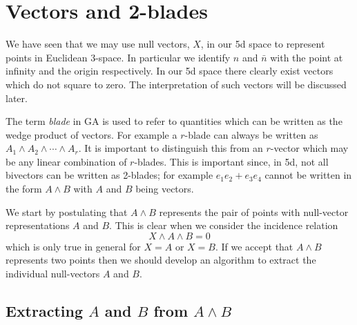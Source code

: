 \section{Vectors and 2-blades}

We have seen that we may use null vectors, $X$, in our 5d space to represent 
points in Euclidean 3-space. In particular we identify $n$ and $\bar{n}$ with 
the point at infinity and the origin respectively. In our 5d space there
clearly exist vectors which do not square to zero. The interpretation of such 
vectors will be discussed later.

The term \emph{blade} in GA is used to refer to quantities which can be written as the wedge
product of vectors. For example a $r$-blade can always be written as
$A_1\wedge A_2 \wedge \cdots \wedge A_r$. It is important to distinguish this
from an $r$-vector which may be any linear combination of $r$-blades. 
This is important since, in 5d, not all bivectors can be written as 2-blades;
for example $e_1e_2 + e_3e_4$ cannot be written in the form $A\wedge B$
with $A$ and $B$ being vectors. 

We start by
postulating that $A \wedge B$ represents the pair of points 
with null-vector representations $A$ and $B$. This is clear when 
we consider the incidence 
relation
\[
X \wedge A \wedge B = 0
\]
which is only true in general for $X=A$ or $X=B$. If we accept that
$A\wedge B$ represents two points then we should develop 
an algorithm to extract the individual null-vectors $A$ and $B$.

\subsection{Extracting $A$ and $B$ from $A\wedge B$}
\label{sec:projectors}

